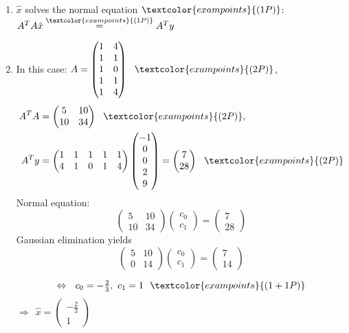 {\color{solution}
\begin{enumerate}
	\item $\hat{x}$ solves the normal equation $\textcolor{exampoints}{(1P)}$: $A^TA\hat{x}\stackrel{\textcolor{exampoints}{(1P)}}{=}A^Ty$
	\item In this case: $A=
	\begin{pmatrix}
	1&4\\
	1&1\\
	1&0\\
	1&1\\
	1&4
	\end{pmatrix}~~\textcolor{exampoints}{(2P)}$,
	\begin{align*}
	A^TA&=\begin{pmatrix}5&10\\10&34\end{pmatrix}~~\textcolor{exampoints}{(2P)},\\
	A^Ty&=\begin{pmatrix}1&1&1&1&1\\4&1&0&1&4\end{pmatrix}
	\begin{pmatrix}-1\\0\\0\\2\\9\end{pmatrix}
	=\begin{pmatrix}7\\28\end{pmatrix}~~\textcolor{exampoints}{(2P)}
	\end{align*}
	Normal equation: 
	$$\begin{pmatrix}5&10\\10&34\end{pmatrix}\begin{pmatrix}c_0\\c_1\end{pmatrix}
	=\begin{pmatrix}7\\28\end{pmatrix}$$
	Gaussian elimination yields
	$$\begin{pmatrix}5&10\\0&14\end{pmatrix}\begin{pmatrix}c_0\\c_1\end{pmatrix}
=\begin{pmatrix}7\\14\end{pmatrix}$$
	
	$$\Leftrightarrow~~c_0=-\tfrac{2}{3},~c_1=1~~\textcolor{exampoints}{(1+1P)}$$
	$\Rightarrow~~\hat{x}=\begin{pmatrix}-\tfrac{2}{3}\\1\end{pmatrix}$
\end{enumerate}
}